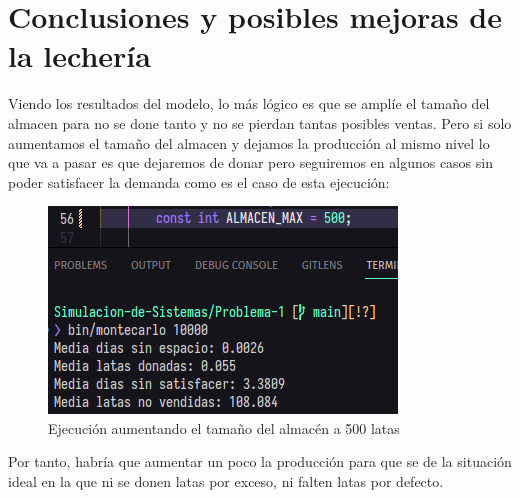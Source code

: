 \documentclass[11pt,a4paper]{report}
\begin{document}
\section{Conclusiones y posibles mejoras de la lechería}

Viendo los resultados del modelo, lo más lógico es que se amplíe el tamaño del almacen para no se done tanto y no se pierdan tantas posibles ventas. Pero si solo aumentamos el tamaño del almacen y dejamos la producción al mismo nivel lo que va a pasar es que dejaremos de donar pero seguiremos en algunos casos sin poder satisfacer la demanda como es el caso de esta ejecución: 

\begin{figure}[htp]
\centering
\includegraphics[scale=0.4]{img/aumento_almacen.png}
\caption{Ejecución aumentando el tamaño del almacén a 500 latas}
\label{}
\end{figure}

Por tanto, habría que aumentar un poco la producción para que se de la situación ideal en la que ni se donen latas por exceso, ni falten latas por defecto.
\end{document}
